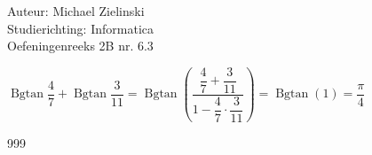 \documentclass[a4paper]{article}
\begin{document}
  
\noindent \large Auteur: Michael Zielinski \\
\noindent \large Studierichting: Informatica\\
\noindent \large Oefeningenreeks 2B nr. 6.3\\

\medskip

\normalsize

$\operatorname{Bgtan}\dfrac{4}{7} + \operatorname{Bgtan}\dfrac{3}{11} = \operatorname{Bgtan}\left(\dfrac{\dfrac{4}{7}+\dfrac{3}{11}}{1-\dfrac{4}{7}\cdot\dfrac{3}{11}}\right) = \operatorname{Bgtan}(1) = \dfrac{\pi}{4}$\\


\begin{thebibliography}{999}	 
\end{thebibliography}
\end{document}
